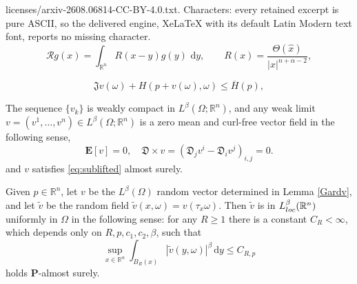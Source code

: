 \documentclass[10pt,a4paper]{amsart}
\newcommand{\R}{{\mathbb{R}}}
\begin{document}
licenses/arxiv-2608.06814-CC-BY-4.0.txt. Characters: every retained excerpt is pure ASCII, so the delivered engine, XeLaTeX with its default Latin Modern text font, reports no missing character.
\begin{equation}
\label{eq:cRdef}
    \mathcal{R}g(x) = \int_{\R^n} R(x-y)g(y)\,\,\mathrm{d}y, \qquad R(x) = \frac{\Theta(\hat{x})}{|x|^{n+\alpha-2}},
\end{equation}

\begin{equation}
\label{eq:sublifted}
    \mathfrak{J}v(\omega) + H(p + v(\omega), \omega) \leq \overline{H}(p),
\end{equation}

\begin{lem}\label{Gardv}
The sequence $\{v_{k}\}$ is weakly compact in $L^{\beta}(\Omega;\R^n)$, and any weak limit $v = (v^1,\dots,v^n) \in L^{\beta}(\Omega;\R^n)$ is a zero mean and curl-free vector field in the following sense,
$$
\mathbf{E}[v] = 0, \quad \mathfrak{D}\times v = \left(\mathfrak{D}_j v^i - \mathfrak{D}_i v^j\right)_{i,j} = 0.
$$
and $v$ satisfies \eqref{eq:sublifted} almost surely. 
\end{lem}

\begin{lem}\label{Ecv} Given $p\in \R^n$, let $v$ be the $L^\beta(\Omega)$ random vector determined in Lemma \ref{Gardv}, and let $\widetilde{v}$ be the random field $\widetilde{v}(x,\omega)=v(\tau_x \omega)$. Then $\widetilde{v}$ is in $L^\beta_{\rm loc}(\R^n)$ uniformly in $\Omega$ in the following sense: for any $R\ge 1$ there is a constant $C_{R} < \infty$, which depends only on $R,p,c_1,c_2,\beta$, such that 
\begin{equation}
\label{eq:unifbddv}
     \sup_{x\in\mathbb{R}^n}\int_{B_R(x)} |\widetilde v(y,\omega)|^{\beta} \,\mathrm{d}y  \le C_{R,p}
\end{equation}
holds $\mathbf{P}$-almost surely.
\end{lem}
\end{document}
